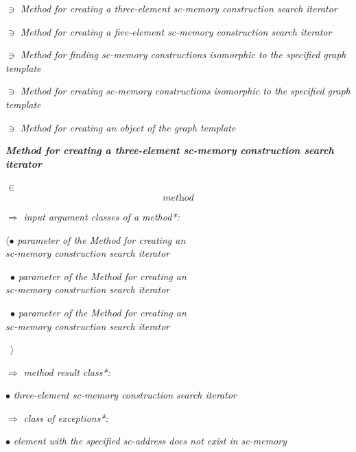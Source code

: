 \documentclass[10pt, twocolumn, a4paper]{article}
\begin{document}
\begin{level1}
\item[ $ \ni$] \textit{Method for creating a three-element sc-memory construction search iterator}
\vspace{2pt}
\item[ $ \ni$] \textit{Method for creating a five-element sc-memory construction search iterator}
\vspace{2pt}
\item[ $ \ni$] \textit{Method for finding sc-memory constructions
isomorphic to the specified graph template}
\vspace{2pt}
\item[ $ \ni$] \textit{Method for creating sc-memory constructions
isomorphic to the specified graph template}
\vspace{2pt}
\item[ $ \ni$] \textit {Method for creating an object of the graph
template}
 \end{level1}
\vspace{20pt} 

\noindent \textbf{\textit{Method for creating a three-element sc-memory
construction search iterator}}
\begin{level1}
\item[ $ \in$]  \begin{equation}
\label{p1}\textit{method}  
\end{equation}

\item[$\Rightarrow$] \textit{input argument classes of a method*:}

\begin{level1}
\item[ \textbf{$ \langle \bullet$}] \textit{parameter of the Method for creating an\\
sc-memory construction search iterator}
\item[ \, $ \bullet$] \textit{parameter of the Method for creating an\\
sc-memory construction search iterator}
\item[ \, $ \bullet$] \textit{parameter of the Method for creating an\\
sc-memory construction search iterator}
\item[ \, $\rangle$] 
 \end{level1}
\item[$\Rightarrow$] \textit{method result class*:}
\begin{level1}
\item[  $ \bullet$] \textit{three-element sc-memory construction search iterator}
\end{level1}
\item[$\Rightarrow$] \textit{class of exceptions*:}
\begin{level1}
\item[  $ \bullet$] \textit{element with the specified sc-address does not exist in sc-memory}
\end{level1}
\end{level1}
\vspace{20pt}
\end{document}
